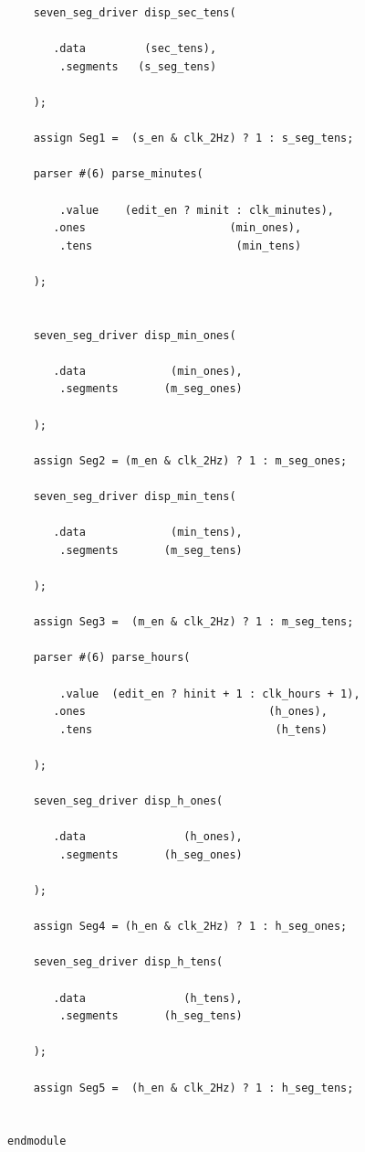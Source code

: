 \documentclass[a4paper]{article}
\begin{document}
\begin{Verbatim}
	seven_seg_driver disp_sec_tens(
	
	   .data         (sec_tens),
		.segments   (s_seg_tens)
	
	);
	
	assign Seg1 =  (s_en & clk_2Hz) ? 1 : s_seg_tens;  
	
	parser #(6) parse_minutes(
	   
		.value    (edit_en ? minit : clk_minutes),
	   .ones                      (min_ones),
		.tens                      (min_tens)
	
	);
	
	
	seven_seg_driver disp_min_ones(
	
	   .data             (min_ones),
		.segments       (m_seg_ones)
	
	);
	
	assign Seg2 = (m_en & clk_2Hz) ? 1 : m_seg_ones; 
	
	seven_seg_driver disp_min_tens(
	
	   .data             (min_tens),
		.segments       (m_seg_tens)
	
	);
	
	assign Seg3 =  (m_en & clk_2Hz) ? 1 : m_seg_tens; 
	
	parser #(6) parse_hours(
	   
		.value  (edit_en ? hinit + 1 : clk_hours + 1),
	   .ones                            (h_ones),
		.tens                            (h_tens)
	
	);
	
	seven_seg_driver disp_h_ones(
	
	   .data               (h_ones),
		.segments       (h_seg_ones)
	
	);
	
	assign Seg4 = (h_en & clk_2Hz) ? 1 : h_seg_ones; 
	
	seven_seg_driver disp_h_tens(
	
	   .data               (h_tens),
		.segments       (h_seg_tens)
	
	);
	
	assign Seg5 =  (h_en & clk_2Hz) ? 1 : h_seg_tens; 
	 

endmodule 
\end{Verbatim}
\end{document}
